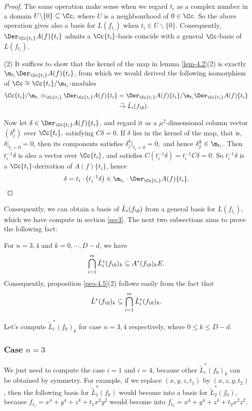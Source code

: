 \begin{proof}
  The same operation make sense when we regard $t_i$ as a complex number in a domain $U\backslash \{0\}\subseteq \Cc,$ where $U$ is a neighbourhood of $0\in \Cc.$ So the above operation gives also a basis for $L(f_{t_i})$ when $t_i\in U\backslash \{0\}$. Consequently, $\Der_{\Cc\{t_i\}} A(f)\{t_i\}$ admits a $\Cc\{t_i\}$-basis coincide with a general $\Cc$-basis of $L(f_{t_i})$.
\item[(2)] It suffices to show that the kernel of the map in lemma \ref{lem-4.2}(2) is exactly $\m_{t_i}\Der_{\Cc\{t_i\}} A(f)\{t_i\}$, from which we would derived the following isomorphism of $\Cc\cong \Cc\{t_i\}/\m_{t_i}$-modules
  \begin{align*}
    \Cc\{t_i\}/\m_{t_i} \otimes_{\Cc\{t_i\}} \Der_{\Cc\{t_i\}} A(f) \{ t_i\}
    &= \Der_{\Cc\{t_i\}} A(f) \{ t_i\}/\m_{t_i} \Der_{\Cc\{t_i\}} A(f) \{ t_i\} \\
    &\stackrel\sim\to \tilde L_i (f_\0).
  \end{align*}

  Now let $\delta \in \Der_{\Cc\{t_i\}} A(f) \{ t_i\}$, and regard it as a $\mu^2$-dimensional column vector $(\delta_j^k)$ over $\Cc\{t_i\},$ satisfying $C\delta=0$. If $\delta$ lies in the kernel of the map, that is, $\delta|_{t_i=0}=0$, then its components satisfies $\delta_j^k|_{t_i=0}=0,$ and hence $\delta_j^k \in \m_{t_i}$.  Then $t_i^{-1}\delta$ is also a vector over $\Cc\{t_i\}$, and satisfies
  $C(t_i^{-1} \delta) = t_i^{-1} C\delta =0.$ So $t_i^{-1} \delta$ is a $\Cc\{t_i\}$-derivation of $A(f)\{t_i\}$, hence 
  \[\delta=t_i\cdot \left( t_i^{-1} \delta\right) \in \m_{t_i} \cdot \Der_{\Cc\{t_i\}} A(f) \{ t_i\}. \qedhere\]
\end{proof}

Consequently, we can obtain a basis of $\tilde L_i(f_\0)$ from a general basis for $L(f_{t_i})$, which we have compute in section \ref{sec3}. The next two subsections aims to prove the following fact:
\begin{proposition}\label{prop-4.9}
  For $n=3,4$ and $k=0,\cdots, D-d$, we have
  \[\bigcap_{i=1}^m \tilde L^*_i(f_\0)_k\subseteq A^*(f_\0)_k E.\]
  Consequently, proposition \ref{pro-4.5}(2) follows easily from the fact that
  \[\tilde L^*(f_\0)_k \subseteq \bigcap_{i=1}^m \tilde L^*_i(f_\0)_k.\]
\end{proposition}
Let's compute $\tilde L^*_i(f_0)_k$ for case $n=3,4$ respectively, where $0 \leqslant k \leqslant D-d$. 


\subsubsection{Case \texorpdfstring{$n=3$}{n=3}}\label{sec-4.2.2}
We just need to compute the case $i=1$ and $i=4$, because other $\tilde L^*_i(f_0)_k$ can be obtained by symmetry. For example, if we replace $(x,y,z,t_1)$ by  $(x,z,y,t_2)$, then the following basis for $\tilde L^*_1(f_0)$ would become into a basis for $\tilde L^*_2(f_0)$, because $f_{t_1}=x^4+y^4+z^4+t_1x^2y^2$ would become into $f_{t_2}=x^4+y^4+z^4+t_2x^2z^2.$
